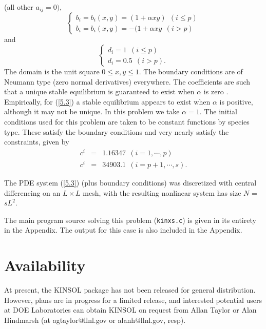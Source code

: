 \documentclass[11pt]{article}
\begin{document}
(all other $a_{ij} = 0 ) ,$
\begin{equation}
\left\{
\begin{array}{l}
b_i = b_i(x,y) = (1 + \alpha xy )  ~ ~ ( i \leq p ) \\
b_i = b_i(x,y) = -(1 + \alpha xy   ~ ~ ( i > p )
\end{array}  \right.
\end{equation}
and
\begin{equation}
\left\{
\begin{array}{l}
d_i =   1 ~ ~ ( i \leq p ) \\
d_i = 0.5 ~ ~ ( i > p ) .
\end{array}  \right.
\end{equation}
The domain is the unit square $0 \leq x,y \leq 1$.  The boundary conditions are
of Neumann type (zero normal derivatives) everywhere.  The coefficients are
such that a unique stable equilibrium is guaranteed to exist when $\alpha$
is zero \cite{Br86}.  Empirically, for (\ref{5.3}) a stable 
equilibrium appears to exist when $\alpha$ is positive, although 
it may not be unique. In this problem we take $\alpha = 1$.
The initial conditions used for this problem are taken to be constant functions
by species type. These satisfy the boundary conditions and very nearly
satisfy the constraints, given by
\begin{eqnarray*}
c^i & = & 1.16347 ~~ (i=1, \cdots, p)\\
c^i & = & 34903.1 ~~ (i=p+1, \cdots, s).
\end{eqnarray*}

The PDE system (\ref{5.3}) (plus boundary conditions) was discretized
with central differencing on an $L \times L$ mesh, with the resulting nonlinear
system has size $N$ = $s L^2$.

The main program source solving this problem ({\tt kinxs.c}) is given in its 
entirety in the Appendix. The output for this case is also included in the
Appendix.

\section{Availability}

At present, the KINSOL package has not been released for general
distribution. However, plans are in progress for a limited release, and
interested potential users at DOE Laboratories can obtain KINSOL on request
from Allan Taylor or Alan Hindmarsh (at agtaylor@llnl.gov or alanh@llnl.gov, 
resp). 
\end{document}
